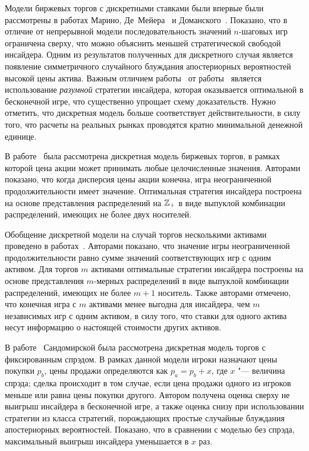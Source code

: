 Модели биржевых торгов с дискретными ставками были впервые были рассмотрены в
работах Марино, Де~Мейера~\cite{demeyer05} и Доманского~\cite{domansky07}.
Показано, что в отличие от непрерывной модели последовательность значений
$n$-шаговых игр ограничена сверху, что можно объяснить меньшей стратегической
свободой инсайдера. Одним из результатов полученных для дискретного случая
является появление симметричного случайного блуждания апостериорных вероятностей
высокой цены актива. Важным отличием работы~\cite{domansky07} от
работы~\cite{demeyer05} является использование \emph{разумной} стратегии
инсайдера, которая оказывается оптимальной в бесконечной игре, что существенно
упрощает схему доказательств. Нужно отметить, что дискретная модель больше
соответствует действительности, в силу того, что расчеты на реальных рынках
проводятся кратно минимальной денежной единице.

В работе~\cite{domansky11} была рассмотрена дискретная модель биржевых торгов, в
рамках которой цена акции может принимать любые целочисленные значения. Авторами
показано, что когда дисперсия цены акции конечна, игра неограниченной
продолжительности имеет значение. Оптимальная стратегия инсайдера построена на
основе представления распределений на $\mathbb{Z}_+$ в виде выпуклой комбинации
распределений, имеющих не более двух носителей.

Обобщение дискретной модели на случай торгов несколькими активами проведено в
работах~\cite{domansky13, domansky14}. Авторами показано, что значение игры
неограниченной продолжительности равно сумме значений соответствующих игр с
одним активом. Для торгов $m$ активами оптимальные стратегии инсайдера построены
на основе представления $m$-мерных распределений в виде выпуклой комбинации
распределений, имеющих не более $m+1$ носитель. Также авторами отмечено, что
конечная игра с $m$ активами менее выгодна для инсайдера, чем $m$ независимых
игр с одним активом, в силу того, что ставки для одного актива несут информацию о
настоящей стоимости других активов.

В работе~\cite{sandomirskaya14} Сандомирской была рассмотрена дискретная модель
торгов с фиксированным спрэдом. В рамках данной модели игроки назначают цены
покупки $p_b$, цены продажи определяются как $p_a = p_b + x$, где $x$ "---
величина спрэда; сделка происходит в том случае, если цена продажи одного из
игроков меньше или равна цены покупки другого. Автором получена оценка сверху не
выигрыш инсайдера в бесконечной игре, а также оценка снизу при использовании
стратегии из класса стратегий, порождающих простые случайные блуждания
апостериорных вероятностей. Показано, что в сравнении с моделью без спрэда,
максимальный выигрыш инсайдера уменьшается в $x$ раз.

